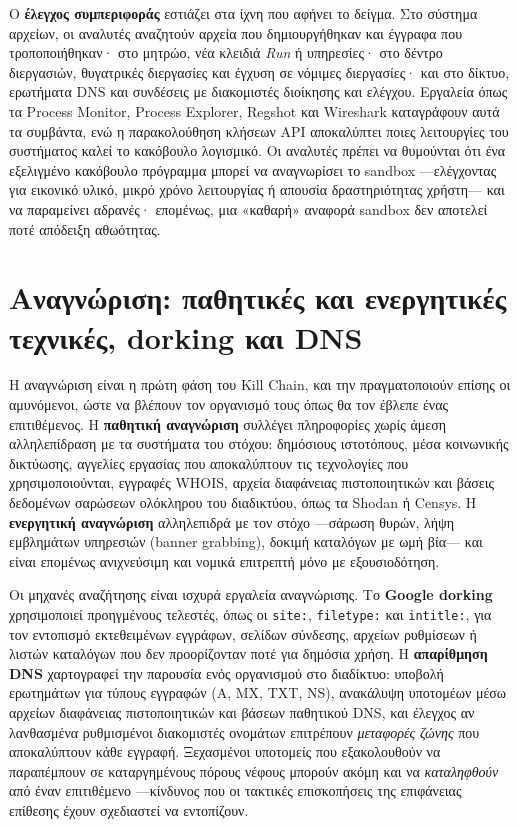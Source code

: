 \documentclass[11pt,openany]{book}
\begin{document}
Ο \textbf{έλεγχος συμπεριφοράς} εστιάζει στα ίχνη που αφήνει το δείγμα. Στο σύστημα αρχείων, οι αναλυτές αναζητούν αρχεία που δημιουργήθηκαν και έγγραφα που τροποποιήθηκαν· στο μητρώο, νέα κλειδιά \emph{Run} ή υπηρεσίες· στο δέντρο διεργασιών, θυγατρικές διεργασίες και έγχυση σε νόμιμες διεργασίες· και στο δίκτυο, ερωτήματα DNS και συνδέσεις με διακομιστές διοίκησης και ελέγχου. Εργαλεία όπως τα Process Monitor, Process Explorer, Regshot και Wireshark καταγράφουν αυτά τα συμβάντα, ενώ η παρακολούθηση κλήσεων API αποκαλύπτει ποιες λειτουργίες του συστήματος καλεί το κακόβουλο λογισμικό. Οι αναλυτές πρέπει να θυμούνται ότι ένα εξελιγμένο κακόβουλο πρόγραμμα μπορεί να αναγνωρίσει το sandbox —ελέγχοντας για εικονικό υλικό, μικρό χρόνο λειτουργίας ή απουσία δραστηριότητας χρήστη— και να παραμείνει αδρανές· επομένως, μια «καθαρή» αναφορά sandbox δεν αποτελεί ποτέ απόδειξη αθωότητας.

\section{Αναγνώριση: παθητικές και ενεργητικές τεχνικές, dorking και DNS}\label{sec:12.3}
Η αναγνώριση είναι η πρώτη φάση του Kill Chain, και την πραγματοποιούν επίσης οι αμυνόμενοι, ώστε να βλέπουν τον οργανισμό τους όπως θα τον έβλεπε ένας επιτιθέμενος. Η \textbf{παθητική αναγνώριση} συλλέγει πληροφορίες χωρίς άμεση αλληλεπίδραση με τα συστήματα του στόχου: δημόσιους ιστοτόπους, μέσα κοινωνικής δικτύωσης, αγγελίες εργασίας που αποκαλύπτουν τις τεχνολογίες που χρησιμοποιούνται, εγγραφές WHOIS, αρχεία διαφάνειας πιστοποιητικών και βάσεις δεδομένων σαρώσεων ολόκληρου του διαδικτύου, όπως τα Shodan ή Censys. Η \textbf{ενεργητική αναγνώριση} αλληλεπιδρά με τον στόχο —σάρωση θυρών, λήψη εμβλημάτων υπηρεσιών (banner grabbing), δοκιμή καταλόγων με ωμή βία— και είναι επομένως ανιχνεύσιμη και νομικά επιτρεπτή μόνο με εξουσιοδότηση.

Οι μηχανές αναζήτησης είναι ισχυρά εργαλεία αναγνώρισης. Το \textbf{Google dorking} χρησιμοποιεί προηγμένους τελεστές, όπως οι \texttt{site:}, \texttt{filetype:} και \texttt{intitle:}, για τον εντοπισμό εκτεθειμένων εγγράφων, σελίδων σύνδεσης, αρχείων ρυθμίσεων ή λιστών καταλόγων που δεν προορίζονταν ποτέ για δημόσια χρήση. Η \textbf{απαρίθμηση DNS} χαρτογραφεί την παρουσία ενός οργανισμού στο διαδίκτυο: υποβολή ερωτημάτων για τύπους εγγραφών (A, MX, TXT, NS), ανακάλυψη υποτομέων μέσω αρχείων διαφάνειας πιστοποιητικών και βάσεων παθητικού DNS, και έλεγχος αν λανθασμένα ρυθμισμένοι διακομιστές ονομάτων επιτρέπουν \emph{μεταφορές ζώνης} που αποκαλύπτουν κάθε εγγραφή. Ξεχασμένοι υποτομείς που εξακολουθούν να παραπέμπουν σε καταργημένους πόρους νέφους μπορούν ακόμη και να \emph{καταληφθούν} από έναν επιτιθέμενο —κίνδυνος που οι τακτικές επισκοπήσεις της επιφάνειας επίθεσης έχουν σχεδιαστεί να εντοπίζουν.
\end{document}
